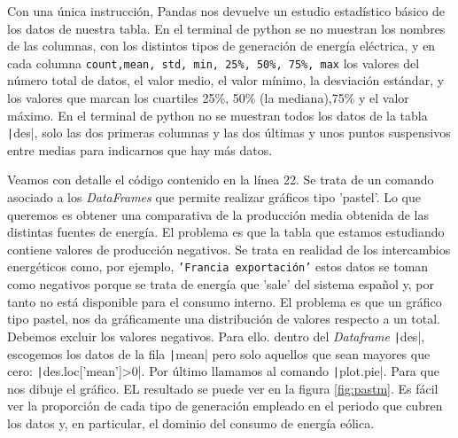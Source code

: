 \begin{paracol}{2}
Con una única instrucción, Pandas nos devuelve un estudio estadístico básico de los datos de nuestra tabla. En el terminal de python se no muestran los nombres de las columnas, con los distintos tipos de generación de energía eléctrica, y en cada columna \texttt{count,mean, std, min, 25\%, 50\%, 75\%, max} los valores del nú\-mero total de datos, el valor medio, el valor mínimo, la desviación estándar, y los valores que marcan los cuartiles 25\%, 50\% (la mediana),75\% y el valor máximo.  En el terminal de python no se muestran todos los datos de la tabla \texttt|des|, solo las dos primeras columnas y las dos últimas y unos puntos suspensivos entre medias para indicarnos que hay más datos. 

Veamos con detalle el código contenido en la línea 22. Se trata de un comando asociado a los \emph{DataFrames} que permite realizar gráficos tipo 'pastel'. Lo que queremos es obtener una comparativa de la producción media obtenida de las distintas fuentes de energía. El problema es que la tabla que estamos estudiando contiene valores de producción negativos. Se trata en realidad de los intercambios energéticos como, por ejemplo, \texttt{'Francia exportación'} estos datos se toman como negativos porque se trata de energía que 'sale' del sistema español y, por tanto no está disponible para el consumo interno. El problema es que un gráfico tipo pastel, nos da gráficamente una distribución de valores respecto a un total. Debemos excluir los valores negativos. Para ello. dentro del \emph{Dataframe} \texttt|des|, escogemos los datos de la fila \texttt|mean| pero solo aquellos que sean mayores que cero: \texttt|des.loc['mean']>0|. Por último llamamos al comando \texttt|plot.pie|. Para que nos dibuje el gráfico. EL resultado se puede ver en la figura \ref{fig:pastm}. Es fácil ver la proporción de cada tipo de generación empleado en el periodo que cubren los datos y, en particular, el dominio del consumo de energía eólica.
\end{paracol}
	 	
